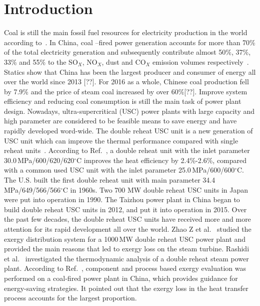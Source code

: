 \documentclass[preprint,12pt]{elsarticle}
\begin{document}
\section{Introduction}
\label{sec1:intro}
Coal is still the main fossil fuel resources for electricity production in the world according to~\cite{Ouedraogo2013Energy}. 
In China, coal –fired power generation accounts for more than 70\% of the total electricity generation and subsequently contribute almost 50\%, 37\%, 33\% and 55\% to the SO$_X$, NO$_X$, dust and CO$_X$ emission volumes respectively~\cite{Zhang2010Analysis}.
Statics show that China has been the largest producer and consumer of energy all over the world since 2013 [??]. 
For 2016 as a whole, Chinese coal production fell by 7.9\% and the price of steam coal increased by over 60\%[??]. 
Improve system efficiency and reducing coal consumption is still the main task of power plant design. Nowadays, ultra-supercritical (USC) power plants with large capacity and high parameter are considered to be feasible means to save energy and have rapidly developed word-wide.
The double reheat USC unit is a new generation of USC unit which can improve the thermal performance compared with single reheat units~\cite{Zhao2017Exergy}. 
According to Ref.~\cite{Yaxiu2013Thermal}, a double reheat unit with the inlet parameter 30.0\,MPa/600/620/620$^\circ$C improves the heat efficiency by 2.4\%-2.6\%, compared with a common used USC unit with the inlet parameter 25.0\,MPa/600/600$^\circ$C.
 The U.S. built the first double reheat unit with main parameter 34.4 MPa/649/566/566$^\circ$C in 1960s.
 Two 700 MW double reheat USC units in Japan were put into operation in 1990. 
 The Taizhou power plant in China began to build double reheat USC units in 2012, and put it into operation in 2015.
 Over the past few decades, the double reheat USC units have received more and more attention for its rapid development all over the world. Zhao Z et al.~\cite{Zhao2017Exergy} studied the exergy distribution system for a 1000\,MW double reheat USC power plant and provided the main reasons that led to exergy loss on the steam turbine.
 Rashidi et al.~\cite{Rashidi2014Thermodynamic} investigated the thermodynamic analysis of a double reheat steam power plant.
 According to Ref.~\cite{Wu2014Component}, component and process based exergy evaluation was performed on a coal-fired power plant in China, which provides guidance for energy-saving strategies.
 It pointed out that the exergy loss in the heat transfer process accounts for the largest proportion.
\end{document}
